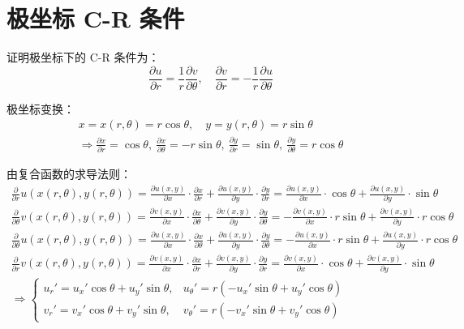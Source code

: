 \documentclass[UTF8]{report}
\theoremstyle{MyLineTheoremStyle} %
\theoremstyle{MyBlockTheoremStyle} %
\theoremstyle{MySubsubsectionStyle} %
\begin{document}
\section{极坐标 C-R 条件}
证明极坐标下的 C-R 条件为：
\begin{equation*}
\frac{\partial u }{\partial r } = \frac{1}{r}\frac{\partial v }{\partial \theta }, \quad \frac{\partial v }{\partial r } = -\frac{1}{r}\frac{\partial u }{\partial \theta } 
\end{equation*}

极坐标变换：
\begin{gather*}
    x = x(r,\theta ) = r\cos \theta, \quad y = y(r,\theta ) = r\sin \theta  \\ \Longrightarrow 
    \frac{\partial x }{\partial r } = \cos \theta,\ \frac{\partial x }{\partial \theta } = -r\sin \theta,\ \frac{\partial y }{\partial r } = \sin \theta,\ \frac{\partial y }{\partial \theta } = r\cos \theta
\end{gather*}

由复合函数的求导法则：
\begin{gather*}
\frac{\partial  }{\partial r }u\left(x(r, \theta),y(r, \theta)\right) 
= \frac{\partial u(x,y) }{\partial x }\cdot\frac{\partial x}{\partial r } + \frac{\partial u(x,y) }{\partial y}\cdot\frac{\partial y}{\partial r } 
= \frac{\partial u(x,y) }{\partial x }\cdot \cos \theta + \frac{\partial u(x,y) }{\partial y}\cdot \sin \theta
\\
\frac{\partial  }{\partial \theta }v\left(x(r, \theta),y(r, \theta)\right) 
= \frac{\partial v(x,y) }{\partial x }\cdot\frac{\partial x}{\partial \theta } + \frac{\partial v(x,y) }{\partial y}\cdot\frac{\partial y}{\partial \theta } 
= - \frac{\partial v(x,y) }{\partial x } \cdot r\sin \theta + \frac{\partial v(x,y) }{\partial y}\cdot r \cos \theta 
\\ 
\frac{\partial  }{\partial \theta }u\left(x(r, \theta),y(r, \theta)\right) 
= \frac{\partial u(x,y) }{\partial x }\cdot\frac{\partial x}{\partial \theta } + \frac{\partial u(x,y) }{\partial y}\cdot\frac{\partial y}{\partial \theta } 
= - \frac{\partial u(x,y) }{\partial x } \cdot r\sin \theta + \frac{\partial u(x,y) }{\partial y}\cdot r \cos \theta 
\\ 
\frac{\partial  }{\partial r }v\left(x(r, \theta),y(r, \theta)\right) 
= \frac{\partial v(x,y) }{\partial x }\cdot\frac{\partial x}{\partial r } + \frac{\partial v(x,y) }{\partial y}\cdot\frac{\partial y}{\partial r } 
= \frac{\partial v(x,y) }{\partial x }\cdot \cos \theta + \frac{\partial v(x,y) }{\partial y}\cdot \sin \theta 
\\ 
\Longrightarrow 
\begin{cases}
    u_r' = u_x' \cos \theta + u_y' \sin \theta , &u_\theta' = r \left(-u_x'\sin \theta + u_y' \cos \theta\right)\\ 
    v_r' =  v_x'\cos \theta + v_y' \sin \theta , &v_\theta' = r\left(-v_x' \sin \theta + v_y' \cos \theta \right)
\end{cases}
\end{gather*}
\end{document}
